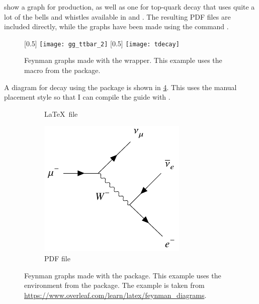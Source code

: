  show a graph for \ttbar production,
as well as one for top-quark decay that uses quite a lot of the bells and whistles available
in  and .
The resulting PDF files are included directly,
while the graphs have been made using the command .
\begin{figure}[htbp]
\begin{tcblisting}{}
\centering
{}
  [0.5\figwidth]{%
    \texttt{[image: gg\_ttbar\_2]}
}
\qquad
{}
  [0.5\figwidth]{%
  \texttt{[image: tdecay]}
}
\caption{Feynman graphs made with the  wrapper.
  This example uses the  macro from the  package.}%
\label{fig:pyfeynhand}
\end{tcblisting}
\end{figure}

A diagram for \Pgm decay using the  package
is shown in \cref{fig:feyn:mudecay}.
This uses the manual placement style so that I can compile the guide with .

\begin{figure}[htbp]
\begin{tcblisting}{}
\centering
\begin{subfigure}{0.6\figwidth}
  \centering
  
  \caption{\LaTeX\ file}%
  \label{fig:feyn:mudecay1}
\end{subfigure}
\qquad
\begin{subfigure}{0.4\figwidth}
  \centering
  \includegraphics[width=0.4\figwidth]{../tikz/mudecay-feynman}
  \caption{PDF file}%
  \label{fig:feyn:mudecay2}
\end{subfigure}
\caption{Feynman graphs made with the  package.
  This example uses the  environment from the  package.
  The example is taken from \url{https://www.overleaf.com/learn/latex/feynman_diagrams}.}%
\label{fig:feyn:mudecay}
\end{tcblisting}
\end{figure}

